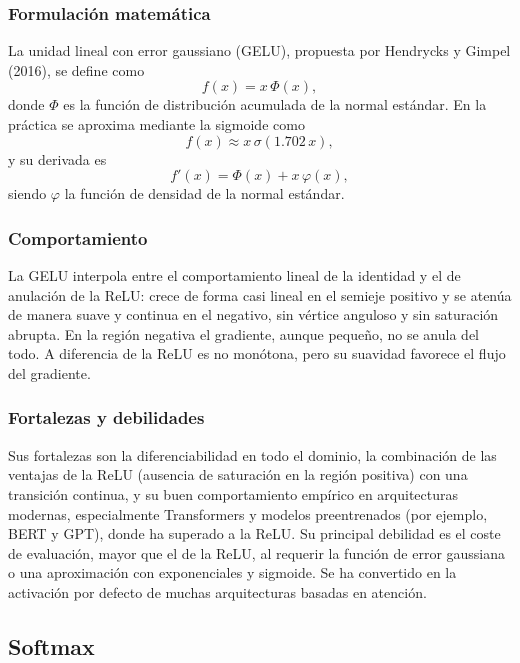 \documentclass[12pt,a4paper]{article}
\begin{document}
\subsubsection{Formulación matemática}
La unidad lineal con error gaussiano (GELU), propuesta por Hendrycks y Gimpel (2016), se define como
\begin{equation*}
f(x) = x\,\Phi(x),
\end{equation*}
donde $\Phi$ es la función de distribución acumulada de la normal estándar. En la práctica se aproxima mediante la sigmoide como
\begin{equation*}
f(x) \approx x\,\sigma(1.702\,x),
\end{equation*}
y su derivada es
\begin{equation*}
f'(x) = \Phi(x) + x\,\varphi(x),
\end{equation*}
siendo $\varphi$ la función de densidad de la normal estándar.

\subsubsection{Comportamiento}
La GELU interpola entre el comportamiento lineal de la identidad y el de anulación de la ReLU: crece de forma casi lineal en el semieje positivo y se atenúa de manera suave y continua en el negativo, sin vértice anguloso y sin saturación abrupta. En la región negativa el gradiente, aunque pequeño, no se anula del todo. A diferencia de la ReLU es no monótona, pero su suavidad favorece el flujo del gradiente.

\subsubsection{Fortalezas y debilidades}
Sus fortalezas son la diferenciabilidad en todo el dominio, la combinación de las ventajas de la ReLU (ausencia de saturación en la región positiva) con una transición continua, y su buen comportamiento empírico en arquitecturas modernas, especialmente Transformers y modelos preentrenados (por ejemplo, BERT y GPT), donde ha superado a la ReLU. Su principal debilidad es el coste de evaluación, mayor que el de la ReLU, al requerir la función de error gaussiana o una aproximación con exponenciales y sigmoide. Se ha convertido en la activación por defecto de muchas arquitecturas basadas en atención.

\subsection{Softmax}
\end{document}
